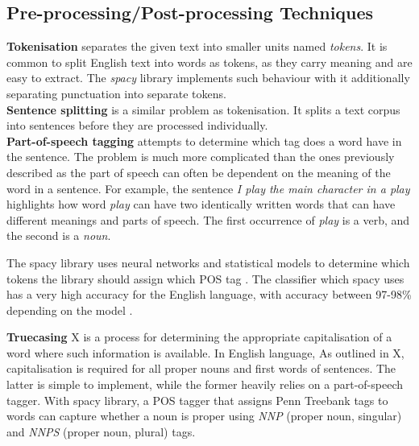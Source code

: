 \subsection{Pre-processing/Post-processing Techniques}
\label{nlp-processing-techniques}

\textbf{Tokenisation} separates the given text into smaller units named \emph{tokens}. 
It is common to split English text into words as tokens, as they carry meaning and are easy to extract.
The \emph{spacy} library implements such behaviour with it additionally separating punctuation into separate tokens.\\

\textbf{Sentence splitting} is a similar problem as tokenisation. It splits a text corpus into sentences before they are processed individually. \\

\textbf{Part-of-speech tagging} attempts to determine which tag does a word have in the sentence.
The problem is much more complicated than the ones previously described as the part of speech can often be dependent on the meaning of the word in a sentence.
For example, the sentence \emph{I play the main character in a play} highlights how word \emph{play} can have two identically written words that can have different meanings and parts of speech.
The first occurrence of \emph{play} is a verb, and the second is a \emph{noun}.

The spacy library uses neural networks and statistical models to determine which tokens the library should assign which POS tag \cite{RefWorks:RefID:25-spacy}.
The classifier which spacy uses has a very high accuracy for the English language, with accuracy between 97-98\% depending on the model \cite{RefWorks:RefID:26-spacy}.

\textbf{Truecasing} X is a process for determining the appropriate capitalisation of a word where such information is available. In English language, 
As outlined in X, capitalisation is required for all proper nouns and first words of sentences. 
The latter is simple to implement, while the former heavily relies on a part-of-speech tagger. 
With spacy library, a POS tagger that assigns Penn Treebank tags to words can capture whether a noun is proper using \textit{NNP} (proper noun, singular) and \textit{NNPS} (proper noun, plural) tags.



